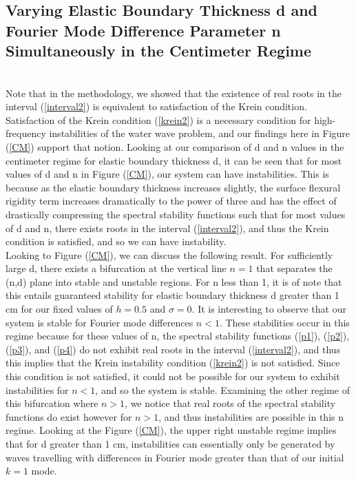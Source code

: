 \documentclass{article}
\begin{document}
\subsection{Varying Elastic Boundary Thickness d and Fourier Mode Difference Parameter  n Simultaneously in the Centimeter Regime}
\\

Note that in the methodology, we showed that the existence of real roots in the interval (\ref{interval2}) is equivalent to satisfaction of the Krein condition. Satisfaction of the Krein condition (\ref{krein2}) is a necessary condition for high-frequency instabilities of the water wave problem, and our findings here in Figure (\ref{CM}) support that notion. Looking at our comparison of d and n values in the centimeter regime for elastic boundary thickness d, it can be seen that for most values of d and n in Figure (\ref{CM}), our system can have instabilities. This is because as the elastic boundary thickness increases slightly, the surface flexural rigidity term increases dramatically to the power of three and has the effect of drastically compressing the spectral stability functions such that for most values of d and n, there exists roots in the interval (\ref{interval2}), and thus the Krein condition is satisfied, and so we can have instability. 
\\

Looking to Figure (\ref{CM}), we can discuss the following result. For sufficiently large d, there exists a bifurcation at the vertical line \(n = 1\) that separates the (n,d) plane into stable and unstable regions. For n less than 1, it is of note that this entails guaranteed stability for elastic boundary thickness d greater than 1 cm for our fixed values of \(h = 0.5\) and \(\sigma = 0\). It is interesting to observe that our system is stable for Fourier mode differences \(n<1\). These stabilities occur in this regime because for these values of n, the spectral stability functions (\ref{p1}), (\ref{p2}),(\ref{p3}), and (\ref{p4}) do not exhibit real roots in the interval (\ref{interval2}), and thus this implies that the Krein instability condition (\ref{krein2}) is not satisfied. Since this condition is not satisfied, it could not be possible for our system to exhibit instabilities for \(n<1\), and so the system is stable. Examining the other regime of this bifurcation where \(n > 1\), we notice that real roots of the spectral stability functions do exist however for \(n>1\), and thus instabilities are possible in this n regime. Looking at the Figure (\ref{CM}), the upper right unstable regime implies that for d greater than 1 cm, instabilities can essentially only be generated by waves travelling with differences in Fourier mode greater than that of our initial \(k = 1\) mode.  
\\
\end{document}
